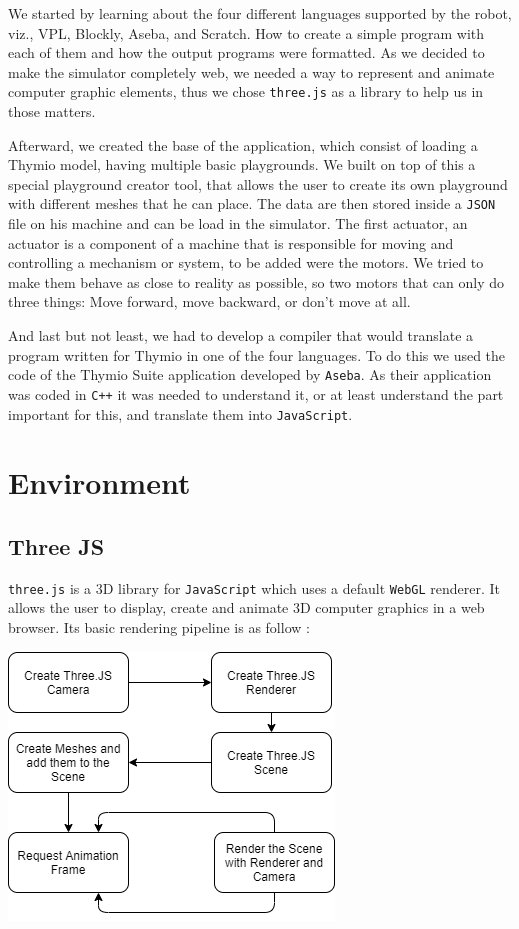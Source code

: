 \documentclass{scrbook}
\begin{document}
We started by learning about the four different languages supported by the robot, viz., VPL, Blockly, Aseba, and Scratch. How to create a simple program with each of them and how the output programs were formatted. 
As we decided to make the simulator completely web, we needed a way to represent and animate computer graphic elements, thus we chose \texttt{three.js} as a library to help us in those matters.

Afterward, we created the base of the application, which consist of loading a Thymio model, having multiple basic playgrounds. We built on top of this a special playground creator tool, that allows the user to create its own playground with different meshes that he can place. 
The data are then stored inside a \texttt{JSON} file on his machine and can be load in the simulator. The first actuator, an actuator is a component of a machine that is responsible for moving and controlling a mechanism or system, 
to be added were the motors. We tried to make them behave as close to reality as possible, so two motors that can only do three things: Move forward, move backward, or don’t move at all.

And last but not least, we had to develop a compiler that would translate a program written for Thymio in one of the four languages. To do this we used the code of the Thymio Suite application developed by \texttt{Aseba}. 
As their application was coded in \texttt{C++} it was needed to understand it, or at least understand the part important for this, and translate them into \texttt{JavaScript}. 

\clearpage

\tableofcontents
\clearpage

\chapter{Environment}

\section{Three JS}

\texttt{three.js} is a 3D library for \texttt{JavaScript} which uses a default \texttt{WebGL} renderer. It allows the user to display, create and animate 3D computer graphics in a web browser. Its basic rendering pipeline is as follow :

\begin{center}
  \includegraphics[scale=0.5]{./basic_threejs_rendering}
\end{center}
\end{document}
